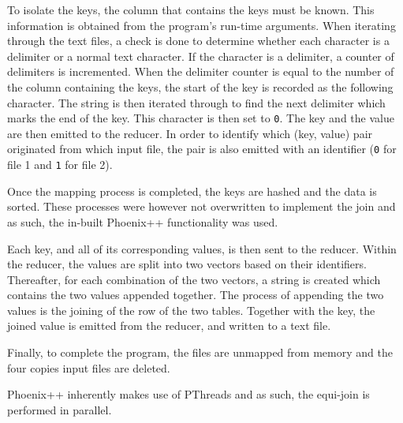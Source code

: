 \documentclass[10pt,twocolumn]{witseiepaper}
\begin{document}
To isolate the keys, the column that contains the keys must be known. This information is obtained from the program's run-time arguments. When iterating through the text files, a check is done to determine whether each character is a delimiter or a normal text character. If the character is a delimiter, a counter of delimiters is incremented. When the delimiter counter is equal to the number of the column containing the keys, the start of the key is recorded as the following character. The string is then iterated through to find the next delimiter which marks the end of the key. This character is then set to \texttt{0}. The key and the value are then emitted to the reducer. In order to identify which (key, value) pair originated from which input file, the pair is also emitted with an identifier (\texttt{0} for file 1 and \texttt{1} for file 2).

Once the mapping process is completed, the keys are hashed and the data is sorted. These processes were however not overwritten to implement the join and as such, the in-built Phoenix++ functionality was used.

Each key, and all of its corresponding values, is then sent to the reducer. Within the reducer, the values are split into two vectors based on their identifiers. Thereafter, for each combination of the two vectors, a string is created which contains the two values appended together. The process of appending the two values is the joining of the row of the two tables. Together with the key, the joined value is emitted from the reducer, and written to a text file.

Finally, to complete the program, the files are unmapped from memory and the four copies input files are deleted.

Phoenix++ inherently makes use of PThreads and as such, the equi-join is performed in parallel.
\end{document}
